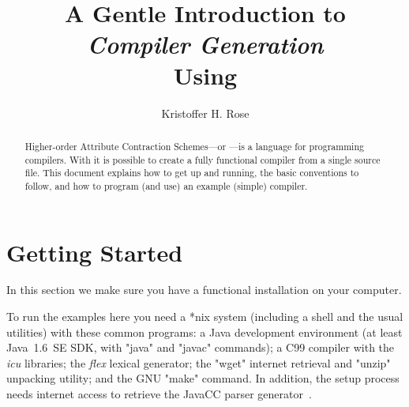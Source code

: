 \documentclass[11pt]{article} %
\title{A Gentle Introduction to\\\emph{Compiler Generation}\\Using \HAX\version}
\author{Kristoffer H. Rose}
\begin{document}
\maketitle

\begin{abstract}\noindent
  Higher-order Attribute Contraction Schemes---or \HAX---is a language for programming compilers.
  With \HAX it is possible to create a fully functional compiler from a single source file.  This
  document explains how to get \HAX up and running, the basic conventions to follow, and how to
  program (and use) an example (simple) compiler.
\end{abstract}

\compacttableofcontents


\section{Getting Started}

In this section we make sure you have a functional \HAX installation on your computer.

\begin{requirements}
  To run the \HAX examples here you need a *nix system (including a shell and the usual utilities)
  with these common programs: a Java development environment (at
  least Java~1.6~SE SDK, with "java" and "javac" commands); a C99 compiler with the \emph{icu}
  libraries; the \emph{flex} lexical generator; the "wget" internet retrieval and "unzip" unpacking
  utility; and the GNU "make" command.  In addition, the setup process needs internet access to retrieve
  the JavaCC parser generator~\cite{javacc}.
\end{requirements}
\end{document}
